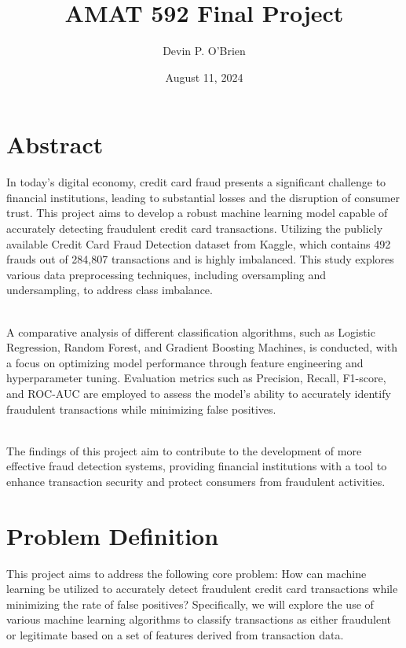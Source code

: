 \documentclass{article}
\title{AMAT 592 Final Project}
\author{Devin P. O'Brien}
\date{August 11, 2024}
\begin{document}
\maketitle

\section{Abstract}

In today’s digital economy, credit card fraud presents a significant challenge to financial institutions, leading to substantial losses and the disruption of consumer trust. This project aims to develop a robust machine learning model capable of accurately detecting fraudulent credit card transactions. Utilizing the publicly available Credit Card Fraud Detection dataset from Kaggle, which contains 492 frauds out of 284,807 transactions and is highly imbalanced. This study explores various data preprocessing techniques, including oversampling and undersampling, to address class imbalance.

\ \\
\noindent
A comparative analysis of different classification algorithms, such as Logistic Regression, Random Forest, and Gradient Boosting Machines, is conducted, with a focus on optimizing model performance through feature engineering and hyperparameter tuning. Evaluation metrics such as Precision, Recall, F1-score, and ROC-AUC are employed to assess the model’s ability to accurately identify fraudulent transactions while minimizing false positives.

\ \\
\noindent
The findings of this project aim to contribute to the development of more effective fraud detection systems, providing financial institutions with a tool to enhance transaction security and protect consumers from fraudulent activities.


\section{Problem Definition}

This project aims to address the following core problem: How can machine learning be utilized to accurately detect fraudulent credit card transactions while minimizing the rate of false positives? Specifically, we will explore the use of various machine learning algorithms to classify transactions as either fraudulent or legitimate based on a set of features derived from transaction data.
\end{document}
